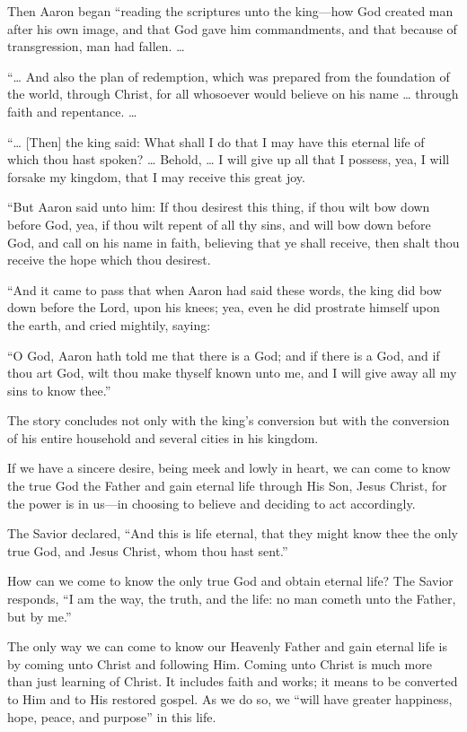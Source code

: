 \documentclass[letterpaper, 11pt]{report}
\begin{document}
Then Aaron began “reading the scriptures unto the king—how God created man after his own image, and that God gave him commandments, and that because of transgression, man had fallen. …

“… And also the plan of redemption, which was prepared from the foundation of the world, through Christ, for all whosoever would believe on his name … through faith and repentance. …

“… [Then] the king said: What shall I do that I may have this eternal life of which thou hast spoken? … Behold, … I will give up all that I possess, yea, I will forsake my kingdom, that I may receive this great joy.

“But Aaron said unto him: If thou desirest this thing, if thou wilt bow down before God, yea, if thou wilt repent of all thy sins, and will bow down before God, and call on his name in faith, believing that ye shall receive, then shalt thou receive the hope which thou desirest.

“And it came to pass that when Aaron had said these words, the king did bow down before the Lord, upon his knees; yea, even he did prostrate himself upon the earth, and cried mightily, saying:

“O God, Aaron hath told me that there is a God; and if there is a God, and if thou art God, wilt thou make thyself known unto me, and I will give away all my sins to know thee.”

The story concludes not only with the king’s conversion but with the conversion of his entire household and several cities in his kingdom.

If we have a sincere desire, being meek and lowly in heart, we can come to know the true God the Father and gain eternal life through His Son, Jesus Christ, for the power is in us—in choosing to believe and deciding to act accordingly.

The Savior declared, “And this is life eternal, that they might know thee the only true God, and Jesus Christ, whom thou hast sent.”

How can we come to know the only true God and obtain eternal life? The Savior responds, “I am the way, the truth, and the life: no man cometh unto the Father, but by me.”

The only way we can come to know our Heavenly Father and gain eternal life is by coming unto Christ and following Him. Coming unto Christ is much more than just learning of Christ. It includes faith and works; it means to be converted to Him and to His restored gospel. As we do so, we “will have greater happiness, hope, peace, and purpose” in this life.
\end{document}
